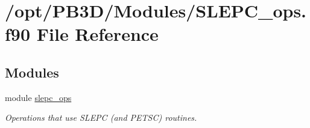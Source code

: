 \hypertarget{SLEPC__ops_8f90}{}\section{/opt/\+P\+B3\+D/\+Modules/\+S\+L\+E\+P\+C\+\_\+ops.f90 File Reference}
\label{SLEPC__ops_8f90}
\subsection*{Modules}
\begin{DoxyCompactItemize}
\item 
module \hyperlink{namespaceslepc__ops}{slepc\+\_\+ops}
\begin{DoxyCompactList}\small\item\em Operations that use S\+L\+E\+PC (and P\+E\+T\+SC) routines. \end{DoxyCompactList}\end{DoxyCompactItemize}
